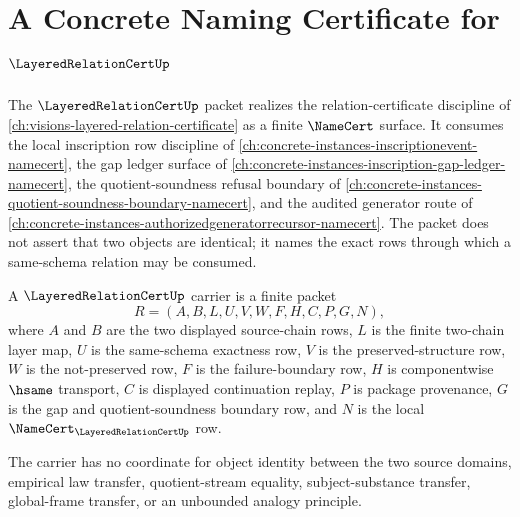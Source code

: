 \chapter{A Concrete Naming Certificate for $\LayeredRelationCertUp$}
\label{ch:concrete-instances-layered-relation-cert-namecert}

The $\LayeredRelationCertUp$ packet realizes the relation-certificate discipline of \autoref{ch:visions-layered-relation-certificate} as a finite $\NameCert$ surface. It consumes the local inscription row discipline of \autoref{ch:concrete-instances-inscriptionevent-namecert}, the gap ledger surface of \autoref{ch:concrete-instances-inscription-gap-ledger-namecert}, the quotient-soundness refusal boundary of \autoref{ch:concrete-instances-quotient-soundness-boundary-namecert}, and the audited generator route of \autoref{ch:concrete-instances-authorizedgeneratorrecursor-namecert}. The packet does not assert that two objects are identical; it names the exact rows through which a same-schema relation may be consumed.

\begin{definition}
\label{def:layered-relation-namecert-row-carrier}
A $\LayeredRelationCertUp$ carrier is a finite packet
$$
R=(A,B,L,U,V,W,F,H,C,P,G,N),
$$
where $A$ and $B$ are the two displayed source-chain rows, $L$ is the finite two-chain layer map, $U$ is the same-schema exactness row, $V$ is the preserved-structure row, $W$ is the not-preserved row, $F$ is the failure-boundary row, $H$ is componentwise $\hsame$ transport, $C$ is displayed continuation replay, $P$ is package provenance, $G$ is the gap and quotient-soundness boundary row, and $N$ is the local $\NameCert_{\LayeredRelationCertUp}$ row.

The carrier has no coordinate for object identity between the two source domains, empirical law transfer, quotient-stream equality, subject-substance transfer, global-frame transfer, or an unbounded analogy principle.
\end{definition}

